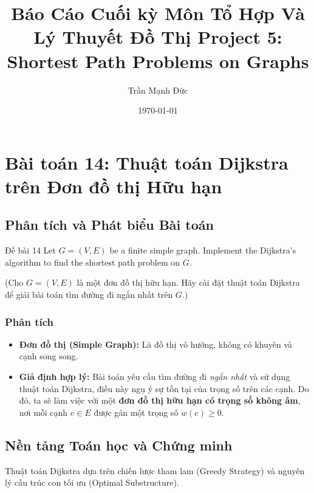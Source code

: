 \documentclass[a4paper,12pt]{article}
\begin{document}
\title{Báo Cáo Cuối kỳ Môn Tổ Hợp Và Lý Thuyết Đồ Thị \newline Project 5: Shortest Path Problems on Graphs}
\author{Trần Mạnh Đức}
\date{\today}
\maketitle

\thispagestyle{empty}
\newpage

\tableofcontents
\newpage

\section{Bài toán 14: Thuật toán Dijkstra trên Đơn đồ thị Hữu hạn}

\subsection{Phân tích và Phát biểu Bài toán}

\begin{problembox}{Đề bài 14}
    Let $G = (V,E)$ be a finite simple graph. Implement the Dijkstra's algorithm to find the shortest path problem on $G$.
    
    (Cho $G = (V,E)$ là một đơn đồ thị hữu hạn. Hãy cài đặt thuật toán Dijkstra để giải bài toán tìm đường đi ngắn nhất trên $G$.)
\end{problembox}

\subsubsection{Phân tích}
\begin{itemize}
    \item \textbf{Đơn đồ thị (Simple Graph):} Là đồ thị vô hướng, không có khuyên và cạnh song song.
    \item \textbf{Giả định hợp lý:} Bài toán yêu cầu tìm đường đi \textit{ngắn nhất} và sử dụng thuật toán Dijkstra, điều này ngụ ý sự tồn tại của trọng số trên các cạnh. Do đó, ta sẽ làm việc với một \textbf{đơn đồ thị hữu hạn có trọng số không âm}, nơi mỗi cạnh $e \in E$ được gán một trọng số $w(e) \geq 0$.
\end{itemize}

\subsection{Nền tảng Toán học và Chứng minh}
Thuật toán Dijkstra dựa trên chiến lược tham lam (Greedy Strategy) và nguyên lý cấu trúc con tối ưu (Optimal Substructure).
\end{document}
